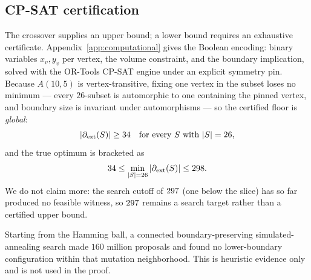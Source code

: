 \subsection{CP-SAT certification}\label{subsec:cert}

The crossover supplies an upper bound; a lower bound requires an exhaustive
certificate.  Appendix~\ref{app:computational} gives the Boolean encoding:
binary variables $x_v, y_v$ per vertex, the volume constraint, and the boundary
implication, solved with the OR-Tools CP-SAT engine under an explicit symmetry
pin.  Because $A(10,5)$ is vertex-transitive, fixing one vertex in the subset
loses no minimum --- every $26$-subset is automorphic to one containing the
pinned vertex, and boundary size is invariant under automorphisms --- so the
certified floor is \emph{global}:
\[
	|\partial_{\mathrm{ext}}(S)| \ge 34{} \quad\text{for every } S \text{ with } |S| = 26,
\]
and the true optimum is bracketed as
\[
	34{} \le \min_{|S| = 26} |\partial_{\mathrm{ext}}(S)| \le 298{}.
\]
We do not claim more: the search cutoff of $297{}$ (one below the
slice) has so far produced no feasible witness, so $297{}$ remains a
search target rather than a certified upper bound.

\begin{remark}
Starting from the Hamming ball, a connected boundary-preserving
simulated-annealing search made $160$ million proposals and found no
lower-boundary configuration within that mutation neighborhood.  This is
heuristic evidence only and is not used in the proof.
\end{remark}
